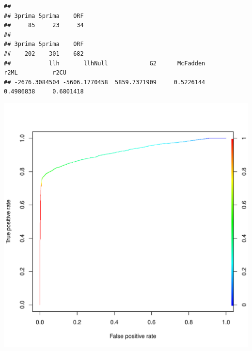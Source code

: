 \documentclass{article}\usepackage[]{graphicx}\usepackage[]{color}
\makeatletter
\def\maxwidth{ %
  \ifdim\Gin@nat@width>\linewidth
    \linewidth
  \else
    \Gin@nat@width
  \fi
}
\newenvironment{kframe}{%
 \def\at@end@of@kframe{}%
 \ifinner\ifhmode%
  \def\at@end@of@kframe{\end{minipage}}%
  \begin{minipage}{\columnwidth}%
 \fi\fi%
 \def\FrameCommand##1{\hskip\@totalleftmargin \hskip-\fboxsep
 \colorbox{shadecolor}{##1}\hskip-\fboxsep
     \hskip-\linewidth \hskip-\@totalleftmargin \hskip\columnwidth}%
 \MakeFramed {\advance\hsize-\width
   \@totalleftmargin\z@ \linewidth\hsize
   \@setminipage}}%
 {\par\unskip\endMakeFramed%
 \at@end@of@kframe}
\newenvironment{knitrout}{}{} %
\makeatother
\begin{document}
\begin{knitrout}
\begin{kframe}
{\ttfamily\noindent\itshape\color{messagecolor}{\#\# Loading required package: gplots}}

{\ttfamily\noindent\itshape\color{messagecolor}{\#\# \\\#\# Attaching package: 'gplots'}}

{\ttfamily\noindent\itshape\color{messagecolor}{\#\# The following object is masked from 'package:stats':\\\#\# \\\#\#\ \ \ \  lowess}}\begin{verbatim}
## 
## 3prima 5prima    ORF 
##     85     23     34
## 
## 3prima 5prima    ORF 
##    202    301    682
##           llh       llhNull            G2      McFadden          r2ML          r2CU 
## -2676.3084504 -5606.1770458  5859.7371909     0.5226144     0.4986838     0.6801418
\end{verbatim}
\end{kframe}

{\centering \includegraphics[width=\maxwidth]{figure/minimal-model-1} 

}



\end{knitrout}
\end{document}
